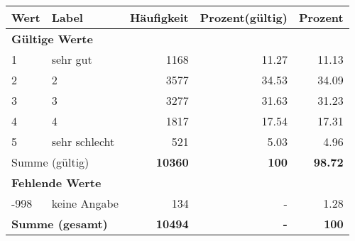      \begin{longtable}{lXrrr}
     \toprule
     \textbf{Wert} & \textbf{Label} & \textbf{Häufigkeit} & \textbf{Prozent(gültig)} & \textbf{Prozent} \\
     \endhead
     \midrule
     \multicolumn{5}{l}{\textbf{Gültige Werte}}\\

     1 &
     \multicolumn{1}{X}{ sehr gut   } &


       \num{1168} &
       \num[round-mode=places,round-precision=2]{11,27} &
         \num[round-mode=places,round-precision=2]{11,13} \\

     2 &
     \multicolumn{1}{X}{ 2   } &


       \num{3577} &
       \num[round-mode=places,round-precision=2]{34,53} &
         \num[round-mode=places,round-precision=2]{34,09} \\

     3 &
     \multicolumn{1}{X}{ 3   } &


       \num{3277} &
       \num[round-mode=places,round-precision=2]{31,63} &
         \num[round-mode=places,round-precision=2]{31,23} \\

     4 &
     \multicolumn{1}{X}{ 4   } &


       \num{1817} &
       \num[round-mode=places,round-precision=2]{17,54} &
         \num[round-mode=places,round-precision=2]{17,31} \\

     5 &
     \multicolumn{1}{X}{ sehr schlecht   } &


       \num{521} &
       \num[round-mode=places,round-precision=2]{5,03} &
         \num[round-mode=places,round-precision=2]{4,96} \\
     \midrule
     \multicolumn{2}{l}{Summe (gültig)} &
       \textbf{\num{10360}} &
     \textbf{100} &
       \textbf{\num[round-mode=places,round-precision=2]{98,72}} \\
     \multicolumn{5}{l}{\textbf{Fehlende Werte}}\\
       -998 &
       keine Angabe &
         \num{134} &
        - &
         \num[round-mode=places,round-precision=2]{1,28} \\
     \midrule
     \multicolumn{2}{l}{\textbf{Summe (gesamt)}} &
          \textbf{\num{10494}} &
        \textbf{-} &
        \textbf{100} \\
     \bottomrule
     \end{longtable}
     
